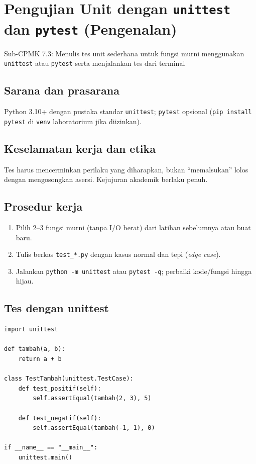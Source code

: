 \documentclass[../main.tex]{subfiles}
\begin{document}
\chapter{Pengujian Unit dengan \texttt{unittest} dan \texttt{pytest} (Pengenalan)}

\begin{subcpmk}
  \item Sub-CPMK 7.3: Menulis tes unit sederhana untuk fungsi murni menggunakan \texttt{unittest} atau \texttt{pytest} serta menjalankan tes dari terminal
\end{subcpmk}


\section{Sarana dan prasarana}

Python 3.10+ dengan pustaka standar \texttt{unittest}; \texttt{pytest} opsional (\texttt{pip install pytest} di \texttt{venv} laboratorium jika diizinkan).

\section{Keselamatan kerja dan etika}

Tes harus mencerminkan perilaku yang diharapkan, bukan ``memalsukan'' lolos dengan mengosongkan asersi. Kejujuran akademik berlaku penuh.

\section{Prosedur kerja}

\begin{enumerate}[leftmargin=*]
  \item Pilih 2--3 fungsi murni (tanpa I/O berat) dari latihan sebelumnya atau buat baru.
  \item Tulis berkas \texttt{test\_*.py} dengan kasus normal dan tepi (\textit{edge case}).
  \item Jalankan \texttt{python -m unittest} atau \texttt{pytest -q}; perbaiki kode/fungsi hingga hijau.
\end{enumerate}

\section{Tes dengan unittest}

\begin{lstlisting}[caption=unittest dasar]
import unittest

def tambah(a, b):
    return a + b

class TestTambah(unittest.TestCase):
    def test_positif(self):
        self.assertEqual(tambah(2, 3), 5)

    def test_negatif(self):
        self.assertEqual(tambah(-1, 1), 0)

if __name__ == "__main__":
    unittest.main()
\end{lstlisting}
\end{document}
